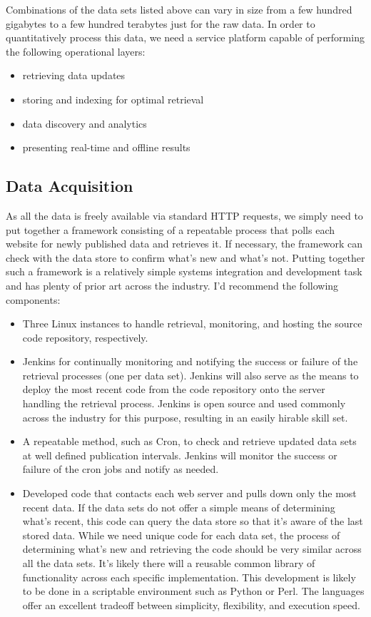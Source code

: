 Combinations of the data sets listed above can vary in size from a few hundred gigabytes to a few hundred terabytes just for the raw data. In order to quantitatively process this data, we need a service platform capable of performing the following operational layers:
\begin{itemize}
	\item retrieving data updates
	\item storing and indexing for optimal retrieval
	\item data discovery and analytics
	\item presenting real-time and offline results
\end{itemize}
\subsection*{Data Acquisition}
As all the data is freely available via standard HTTP requests, we simply need to put together a framework consisting of a repeatable process that polls each website for newly published data and retrieves it. If necessary, the framework can check with the data store to confirm what's new and what's not. Putting together such a framework is a relatively simple systems integration and development task and has plenty of prior art across the industry. I'd recommend the following components:
\begin{itemize}
	\item Three Linux instances to handle retrieval, monitoring, and hosting the source code repository, respectively.
	\item Jenkins for continually monitoring and notifying the success or failure of the retrieval processes (one per data set). Jenkins will also serve as the means to deploy the most recent code from the code repository onto the server handling the retrieval process. Jenkins is open source and used commonly across the industry for this purpose, resulting in an easily hirable skill set.\cite{jenkins}
	\item A repeatable method, such as Cron, to check and retrieve updated data sets at well defined publication intervals. Jenkins will monitor the success or failure of the cron jobs and notify as needed.
	\item Developed code that contacts each web server and pulls down only the most recent data. If the data sets do not offer a simple means of determining what's recent, this code can query the data store so that it's aware of the last stored data. While we need unique code for each data set, the process of determining what's new and retrieving the code should be very similar across all the data sets. It's likely there will a reusable common library of functionality across each specific implementation. This development is likely to be done in a scriptable environment such as Python or Perl. The languages offer an excellent tradeoff between simplicity, flexibility, and execution speed.
\end{itemize}

